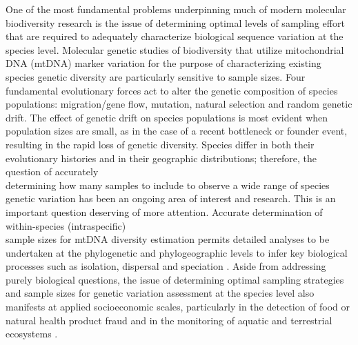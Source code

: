 One of the most fundamental problems underpinning much of modern molecular \\ biodiversity research is the issue of determining optimal levels of sampling effort that are required to adequately characterize biological sequence variation at the species level. Molecular genetic studies of biodiversity that utilize mitochondrial DNA (mtDNA) marker variation for the purpose of characterizing existing species genetic diversity are particularly sensitive to sample sizes. Four fundamental evolutionary forces act to alter the genetic composition of species populations: migration/gene flow, mutation, natural selection and random genetic drift. The effect of genetic drift on species populations is most evident when population sizes are small, as in the case of a recent bottleneck or founder event, resulting in the rapid loss of genetic diversity. Species differ in both their evolutionary histories and in their geographic distributions; therefore, the question of accurately \\ determining how many samples to include to observe a wide range of species genetic variation has been an ongoing area of interest and research. This is an important question deserving of more attention. Accurate determination of within-species (intraspecific) \\ sample sizes for mtDNA diversity estimation permits detailed analyses to be undertaken at the phylogenetic and phylogeographic levels to infer key biological processes such as isolation, dispersal and speciation \cite{avise1987intraspecific, dixon2006means, funk2003species}. Aside from addressing purely biological questions, the issue of determining optimal sampling strategies and sample sizes for genetic variation assessment at the species level also manifests at applied socioeconomic scales, particularly in the detection of food or natural health product fraud and in the monitoring of aquatic and terrestrial ecosystems \cite{hunter2015environmental}.



